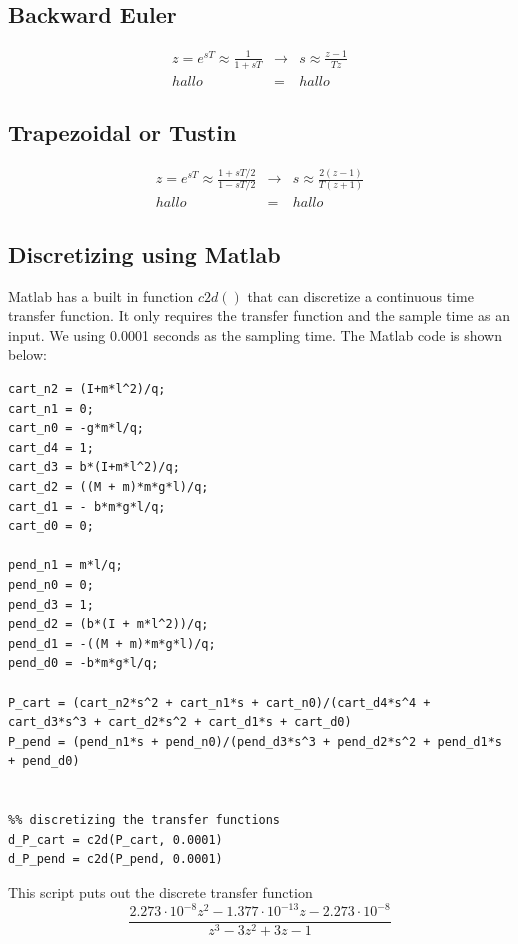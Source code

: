 	\subsection{Backward Euler}
		
		\begin{eqnarray}
			z = e^{sT} \approx \frac{1}{1 + sT} &\rightarrow& s \approx \frac{z - 1}{Tz}\\
			hallo &=& hallo
		\end{eqnarray}
	
	\subsection{Trapezoidal or Tustin}
	
		\begin{eqnarray}
			z = e^{sT} \approx \frac{1 + sT/2}{1 - sT/2} &\rightarrow& s \approx \frac{2\left( z - 1\right) }{T\left( z+1\right) }\\
			hallo &=& hallo
		\end{eqnarray}
		
	\subsection{Discretizing using Matlab}
	Matlab has a built in function $c2d()$ that can discretize a continuous time transfer function. It only requires the transfer function and the sample time as an input. We using 0.0001 seconds as the sampling time. The Matlab code is shown below:
\begin{lstlisting}
cart_n2 = (I+m*l^2)/q;
cart_n1 = 0;
cart_n0 = -g*m*l/q;
cart_d4 = 1;
cart_d3 = b*(I+m*l^2)/q;
cart_d2 = ((M + m)*m*g*l)/q;
cart_d1 = - b*m*g*l/q;
cart_d0 = 0;

pend_n1 = m*l/q;
pend_n0 = 0;
pend_d3 = 1;
pend_d2 = (b*(I + m*l^2))/q;
pend_d1 = -((M + m)*m*g*l)/q;
pend_d0 = -b*m*g*l/q;

P_cart = (cart_n2*s^2 + cart_n1*s + cart_n0)/(cart_d4*s^4 + cart_d3*s^3 + cart_d2*s^2 + cart_d1*s + cart_d0)
P_pend = (pend_n1*s + pend_n0)/(pend_d3*s^3 + pend_d2*s^2 + pend_d1*s + pend_d0)


%% discretizing the transfer functions
d_P_cart = c2d(P_cart, 0.0001)
d_P_pend = c2d(P_pend, 0.0001)

\end{lstlisting}

This script puts out the discrete transfer function
\begin{equation}
	\frac{2.273\cdot 10^{-8}z^2-1.377\cdot 10^{-13} z-2.273\cdot 10^{-8}}{z^3-3z^2+3z-1}
\end{equation}
